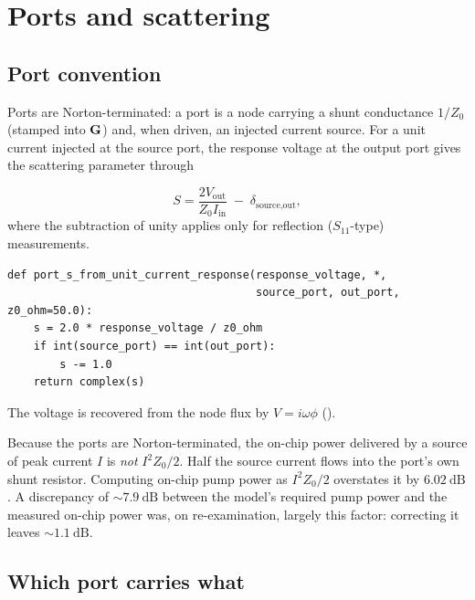 \section{Ports and scattering}

\subsection{Port convention}

Ports are Norton-terminated: a port is a node carrying a shunt conductance
$1/Z_0$ (stamped into $\mathbf{G}$) and, when driven, an injected current source. For
a unit current injected at the source port, the response voltage at the output
port gives the scattering parameter through

\begin{equation}
  S = \frac{2 V_{\mathrm{out}}}{Z_0 I_{\mathrm{in}}}
      \;-\;\delta_{\text{source},\text{out}} ,
  \label{eq:s-from-response}
\end{equation}
where the subtraction of unity applies only for reflection ($S_{11}$-type)
measurements.

\begin{implnote}
\begin{lstlisting}
def port_s_from_unit_current_response(response_voltage, *,
                                      source_port, out_port, z0_ohm=50.0):
    s = 2.0 * response_voltage / z0_ohm
    if int(source_port) == int(out_port):
        s -= 1.0
    return complex(s)
\end{lstlisting}
The voltage is recovered from the node flux by $V = i\omega\phi$
().
\end{implnote}

\begin{caveat}
Because the ports are Norton-terminated, the on-chip power delivered by a source
of peak current $I$ is \emph{not} $I^{2}Z_0/2$. Half the source current flows
into the port's own shunt resistor. Computing on-chip pump power as $I^{2}Z_0/2$
overstates it by $\SI{6.02}{\dB}$. A discrepancy of $\sim\SI{7.9}{\dB}$ between
the model's required pump power and the measured on-chip power was, on
re-examination, largely this factor: correcting it leaves $\sim\SI{1.1}{\dB}$.
\end{caveat}

\subsection{Which port carries what}

